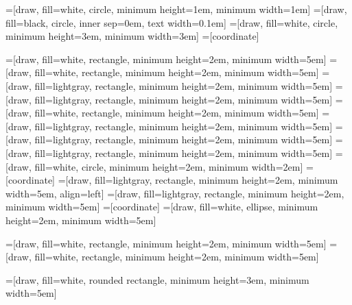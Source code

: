 =[draw, fill=white, circle, minimum height=1em, minimum width=1em]
=[draw, fill=black, circle, inner sep=0em, text width=0.1em]
=[draw, fill=white, circle, minimum height=3em, minimum width=3em]
=[coordinate]

=[draw, fill=white, rectangle, minimum height=2em, minimum width=5em]
=[draw, fill=white, rectangle, minimum height=2em, minimum width=5em]
=[draw, fill=lightgray, rectangle, minimum height=2em, minimum width=5em]
=[draw, fill=lightgray, rectangle, minimum height=2em, minimum width=5em]
=[draw, fill=white, rectangle, minimum height=2em, minimum width=5em]
=[draw, fill=lightgray, rectangle, minimum height=2em, minimum width=5em]
=[draw, fill=lightgray, rectangle, minimum height=2em, minimum width=5em]
=[draw, fill=lightgray, rectangle, minimum height=2em, minimum width=5em]
=[draw, fill=white, circle, minimum height=2em, minimum width=2em]
=[coordinate]
=[draw, fill=lightgray, rectangle, minimum height=2em, minimum width=5em, align=left]
=[draw, fill=lightgray, rectangle, minimum height=2em, minimum width=5em]
=[coordinate]
=[draw, fill=white, ellipse, minimum height=2em, minimum width=5em]

=[draw, fill=white, rectangle, minimum height=2em, minimum width=5em]
=[draw, fill=white, rectangle, minimum height=2em, minimum width=5em]

=[draw, fill=white, rounded rectangle, minimum height=3em, minimum width=5em]
